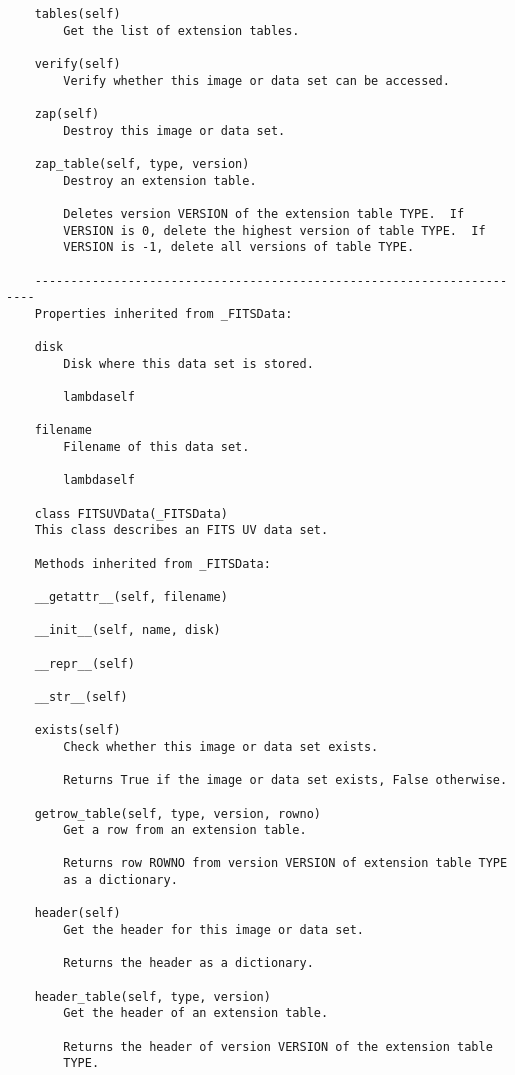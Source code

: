 \documentclass[11pt]{report}
\begin{document}
\begin{verbatim}
    tables(self)
        Get the list of extension tables.
    
    verify(self)
        Verify whether this image or data set can be accessed.
    
    zap(self)
        Destroy this image or data set.
    
    zap_table(self, type, version)
        Destroy an extension table.
        
        Deletes version VERSION of the extension table TYPE.  If
        VERSION is 0, delete the highest version of table TYPE.  If
        VERSION is -1, delete all versions of table TYPE.
    
    ----------------------------------------------------------------------
    Properties inherited from _FITSData:
    
    disk
        Disk where this data set is stored.
    
        lambdaself
    
    filename
        Filename of this data set.
    
        lambdaself
    
    class FITSUVData(_FITSData)
    This class describes an FITS UV data set.
    
    Methods inherited from _FITSData:
    
    __getattr__(self, filename)
    
    __init__(self, name, disk)
    
    __repr__(self)
    
    __str__(self)
    
    exists(self)
        Check whether this image or data set exists.
        
        Returns True if the image or data set exists, False otherwise.
    
    getrow_table(self, type, version, rowno)
        Get a row from an extension table.
        
        Returns row ROWNO from version VERSION of extension table TYPE
        as a dictionary.
    
    header(self)
        Get the header for this image or data set.
        
        Returns the header as a dictionary.
    
    header_table(self, type, version)
        Get the header of an extension table.
        
        Returns the header of version VERSION of the extension table
        TYPE.
    

\end{verbatim}
\end{document}
